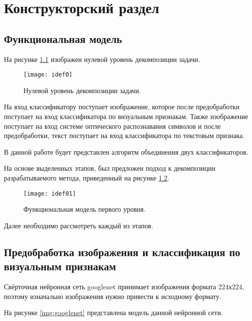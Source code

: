 \chapter{\textbf{Конструкторский раздел}}

\section{Функциональная модель}

На рисунке \ref{img:idef0} изображен нулевой уровень декомпозиции задачи. 

\begin{figure}[H]
	\centering
	\texttt{[image: idef0]}
	\caption{Нулевой уровень декомпозиции задачи. }
	\label{img:idef0}
\end{figure}

На вход классификатору поступает изображение, которое после предобработки поступает на вход классификатора по визуальным признакам. Также изображение поступает на вход системе оптического распознавания символов и после предобработки, текст поступает на вход классификатора по текстовым признака.

В данной работе будет представлен алгоритм объединения двух классификаторов.

На основе выделенных этапов, был предложен подход к декомпозиции разрабатываемого метода, приведенный на рисунке \ref{img:idef01}.

\begin{figure}[H]
	\centering
	\texttt{[image: idef01]}
	\caption{Функциональная модель первого уровня. }
	\label{img:idef01}
\end{figure}

Далее необходимо рассмотреть каждый из этапов.

\section{Предобработка изображения и классификация по визуальным признакам}

Свёрточная нейронная сеть googlenet принимает изображения формата 224х224, поэтому изначально изображения нужно привести к исходному формату.

На рисунке \ref{img:googlenet} представлена модель данной нейронной сети.

